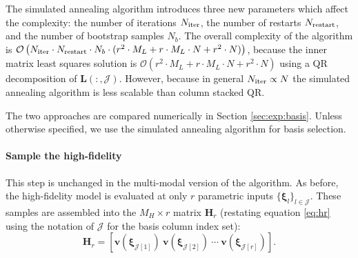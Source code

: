 \documentclass[preprint,10pt]{elsarticle}
\begin{document}
\begin{enumerate}
The simulated annealing algorithm introduces three new parameters which affect the complexity: the number of iterations $N_{\rm iter}$, the number of restarts $N_{\rm restart}$, and the number of bootstrap samples $N_b$. The overall complexity of the algorithm is $\mathcal{O} \left( N_{\rm iter} \cdot N_{\rm restart} \cdot N_b \cdot (r^2 \cdot M_L + r \cdot M_L \cdot N + r^2 \cdot N )\right)$, because the inner matrix least squares solution is $\mathcal{O} \left( r^2 \cdot M_L + r \cdot M_L \cdot N + r^2 \cdot N \right)$ using a QR decomposition of $\bm L(:, \mathcal{J})$. However, because in general $N_{\rm iter} \propto N$ the simulated annealing algorithm is less scalable than column stacked QR.


\end{enumerate}

The two approaches are compared numerically in Section \ref{sec:exp:basis}. Unless otherwise specified, we use the simulated annealing algorithm for basis selection.



\paragraph{Sample the high-fidelity} This step is unchanged in the multi-modal version of the algorithm. As before, the high-fidelity model is evaluated at only $r$ parametric inputs $\{ \boldsymbol \xi_l \}_{l \in \mathcal{J}}$. These samples are assembled into the $M_H \times r$ matrix $\boldsymbol H_r$ (restating equation \ref{eq:hr} using the notation of $\mathcal{J}$ for the basis column index set): 
\begin{equation}
    \boldsymbol H_r = \left[ \bm v(\bm \xi_{\mathcal{J}[1]}) \ \bm v(\bm \xi_{\mathcal{J}[2]}) \ \cdots \ \bm v(\bm \xi_{\mathcal{J}[r]})\right].
\end{equation}
\end{document}
